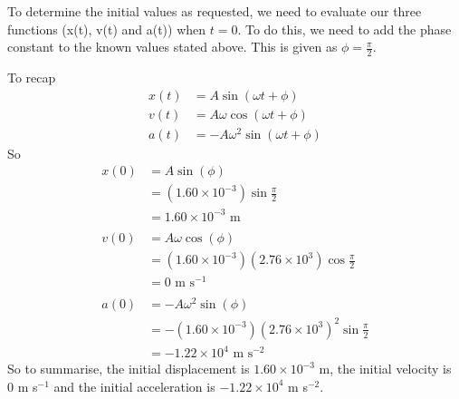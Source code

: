 \documentclass[a4paper,12pt]{article}
\numberwithin{equation}{section}
\begin{document}
\begin{question}
\qpart
To determine the initial values as requested, we need to evaluate our three functions (x(t), v(t) and a(t)) when $t=0$. To do this, we need to add the phase constant to the known values stated above. This is given as $\phi=\frac{\pi}{2}$.

To recap
\begin{align*}
x(t)&=A\sin(\omega t + \phi)\\
v(t)&=A\omega\cos(\omega t + \phi)\\
a(t)&=-A\omega^2\sin(\omega t + \phi)
\end{align*}
So
\begin{align*}
x(0)&=A\sin(\phi)\\
&=(1.60\times 10^{-3})\sin\frac{\pi}{2}\\
&=1.60\times 10^{-3} \text{ m}\\
\\
v(0)&=A\omega\cos(\phi)\\
&=(1.60\times 10^{-3})(2.76 \times 10^3)\cos\frac{\pi}{2}\\
&= 0 \text{ m s}^{-1}\\
\\
a(0)&=-A\omega^2\sin(\phi)\\
&=-(1.60\times 10^{-3})(2.76 \times 10^3)^2\sin\frac{\pi}{2}\\
&=-1.22\times 10^4 \text{ m s}^{-2}
\end{align*}
So to summarise, the initial displacement is $1.60\times 10^{-3}$ m, the initial velocity is\\ 0 m s$^{-1}$ and the initial acceleration is $-1.22\times 10^4$ m s$^{-2}$.

\end{question}
\end{document}
